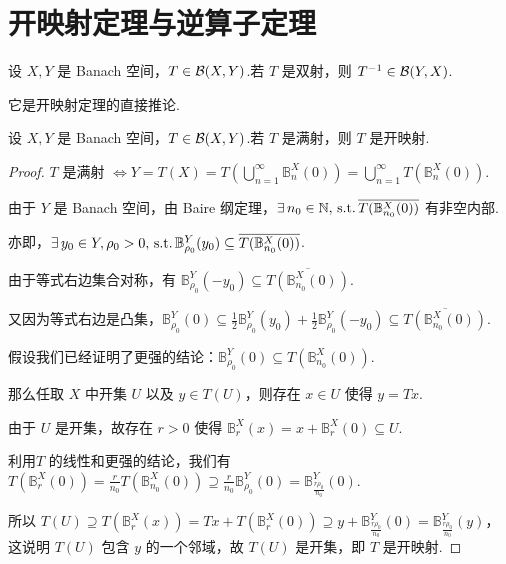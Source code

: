 \section{开映射定理与逆算子定理}

\begin{theorem}[逆算子定理]
    设 $X, Y$ 是 Banach 空间，$T \in \mathcal{B}(X,Y)$.若 $T$ 是双射，则 $T^{-1} \in \mathcal{B}(Y,X)$.
\end{theorem}
它是开映射定理的直接推论.

\begin{theorem}[开映射定理]
    设 $X, Y$ 是 Banach 空间，$T \in \mathcal{B}(X,Y)$.若 $T$ 是满射，则 $T$ 是开映射.
\end{theorem}
\begin{proof}
    $T$ 是满射 $\iff Y = T(X) = T\left(\bigcup_{n=1}^\infty \mathbb{B}_n^X(0)\right) = \bigcup_{n=1}^\infty {T(\mathbb{B}_n^X(0))}$.\par
    由于 $Y$ 是 Banach 空间，由 Baire 纲定理，$\exists\, n_0 \in \mathbb{N},\operatorname{\,\text{s.t.}} \overline{T(\mathbb{B}_{n_0}^X(0))}$ 有非空内部.\par
    亦即，$\exists\, y_0 \in Y, \rho_0 > 0,\operatorname{\,\text{s.t.}} \mathbb{B}_{\rho_0}^Y(y_0) \subseteq \overline{T(\mathbb{B}_{n_0}^X(0))}$.\par
    由于等式右边集合对称，有 $\mathbb{B}_{\rho_0}^Y(-y_0) \subseteq \overline{T(\mathbb{B}_{n_0}^X(0))}$.\par
    又因为等式右边是凸集，$\mathbb{B}_{\rho_0}^Y(0) \subseteq \frac{1}{2} \mathbb{B}_{\rho_0}^Y(y_0) + \frac{1}{2} \mathbb{B}_{\rho_0}^Y(-y_0) \subseteq \overline{T(\mathbb{B}_{n_0}^X(0))}$.\par
    假设我们已经证明了更强的结论：$\mathbb{B}_{\rho_0}^Y(0) \subseteq T(\mathbb{B}_{n_0}^X(0))$.\par
    那么任取 $X$ 中开集 $U$ 以及 $y \in T(U)$，则存在 $x \in U$ 使得 $y = Tx$.\par
    由于 $U$ 是开集，故存在 $r > 0$ 使得 $\mathbb{B}_r^X(x) = x + \mathbb{B}_r^X(0) \subseteq U$.\par
    利用$T$ 的线性和更强的结论，我们有 $T(\mathbb{B}_r^X(0)) = \frac{r}{n_0} T(\mathbb{B}_{n_0}^X(0)) \supseteq \frac{r}{n_0} \mathbb{B}_{\rho_0}^Y(0) = \mathbb{B}_{\frac{r\rho_0}{n_0}}^Y(0)$.\par
    所以 $T(U) \supseteq T(\mathbb{B}_r^X(x)) = Tx + T(\mathbb{B}_r^X(0)) \supseteq y + \mathbb{B}_{\frac{r\rho_0}{n_0}}^Y(0) = \mathbb{B}_{\frac{r\rho_0}{n_0}}^Y(y)$，这说明 $T(U)$ 包含 $y$ 的一个邻域，故 $T(U)$ 是开集，即 $T$ 是开映射.
\end{proof}

